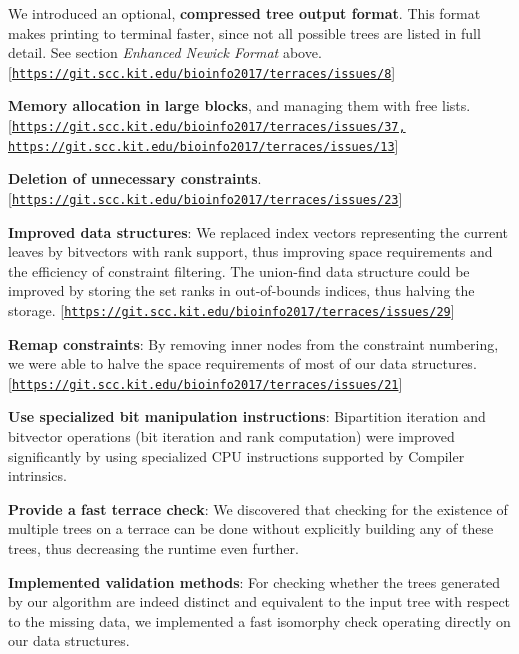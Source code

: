 \begin{DoxyItemize}
\item We introduced an optional, {\bfseries compressed tree output format}. This format makes printing to terminal faster, since not all possible trees are listed in full detail. See section {\itshape Enhanced Newick Format} above. \mbox{[}\href{https://git.scc.kit.edu/bioinfo2017/terraces/issues/8}{\tt https\+://git.\+scc.\+kit.\+edu/bioinfo2017/terraces/issues/8}\mbox{]}
\item {\bfseries Memory allocation in large blocks}, and managing them with free lists. \mbox{[}\href{https://git.scc.kit.edu/bioinfo2017/terraces/issues/37,}{\tt https\+://git.\+scc.\+kit.\+edu/bioinfo2017/terraces/issues/37,} \href{https://git.scc.kit.edu/bioinfo2017/terraces/issues/13}{\tt https\+://git.\+scc.\+kit.\+edu/bioinfo2017/terraces/issues/13}\mbox{]}
\item {\bfseries Deletion of unnecessary constraints}. \mbox{[}\href{https://git.scc.kit.edu/bioinfo2017/terraces/issues/23}{\tt https\+://git.\+scc.\+kit.\+edu/bioinfo2017/terraces/issues/23}\mbox{]}
\item {\bfseries Improved data structures}\+: We replaced index vectors representing the current leaves by bitvectors with rank support, thus improving space requirements and the efficiency of constraint filtering. The union-\/find data structure could be improved by storing the set ranks in out-\/of-\/bounds indices, thus halving the storage. \mbox{[}\href{https://git.scc.kit.edu/bioinfo2017/terraces/issues/29}{\tt https\+://git.\+scc.\+kit.\+edu/bioinfo2017/terraces/issues/29}\mbox{]}
\item {\bfseries Remap constraints}\+: By removing inner nodes from the constraint numbering, we were able to halve the space requirements of most of our data structures. \mbox{[}\href{https://git.scc.kit.edu/bioinfo2017/terraces/issues/21}{\tt https\+://git.\+scc.\+kit.\+edu/bioinfo2017/terraces/issues/21}\mbox{]}
\item {\bfseries Use specialized bit manipulation instructions}\+: Bipartition iteration and bitvector operations (bit iteration and rank computation) were improved significantly by using specialized C\+PU instructions supported by Compiler intrinsics.
\item {\bfseries Provide a fast terrace check}\+: We discovered that checking for the existence of multiple trees on a terrace can be done without explicitly building any of these trees, thus decreasing the runtime even further.
\item {\bfseries Implemented validation methods}\+: For checking whether the trees generated by our algorithm are indeed distinct and equivalent to the input tree with respect to the missing data, we implemented a fast isomorphy check operating directly on our data structures.

\end{DoxyItemize}
